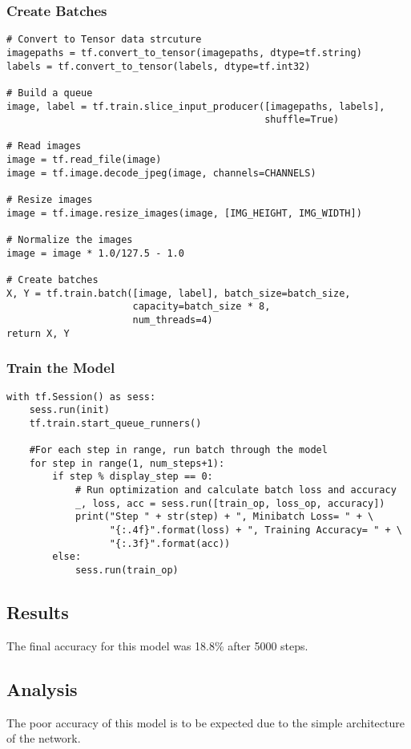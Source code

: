 \subsubsection*{Create Batches}
\begin{lstlisting}[style=Python]
# Convert to Tensor data strcuture
imagepaths = tf.convert_to_tensor(imagepaths, dtype=tf.string)
labels = tf.convert_to_tensor(labels, dtype=tf.int32)

# Build a queue
image, label = tf.train.slice_input_producer([imagepaths, labels],
                                             shuffle=True)

# Read images
image = tf.read_file(image)
image = tf.image.decode_jpeg(image, channels=CHANNELS)

# Resize images
image = tf.image.resize_images(image, [IMG_HEIGHT, IMG_WIDTH])

# Normalize the images
image = image * 1.0/127.5 - 1.0

# Create batches
X, Y = tf.train.batch([image, label], batch_size=batch_size,
                      capacity=batch_size * 8,
                      num_threads=4)
return X, Y
\end{lstlisting}

\subsubsection*{Train the Model}
\begin{lstlisting}[style=Python]
with tf.Session() as sess:
    sess.run(init)
    tf.train.start_queue_runners()

    #For each step in range, run batch through the model
    for step in range(1, num_steps+1):
        if step % display_step == 0:
            # Run optimization and calculate batch loss and accuracy
            _, loss, acc = sess.run([train_op, loss_op, accuracy])
            print("Step " + str(step) + ", Minibatch Loss= " + \
                  "{:.4f}".format(loss) + ", Training Accuracy= " + \
                  "{:.3f}".format(acc))
        else:
            sess.run(train_op)
\end{lstlisting}

\subsection*{Results}
The final accuracy for this model was 18.8\% after 5000 steps.

\subsection*{Analysis}
The poor accuracy of this model is to be expected due to the simple architecture of the network.